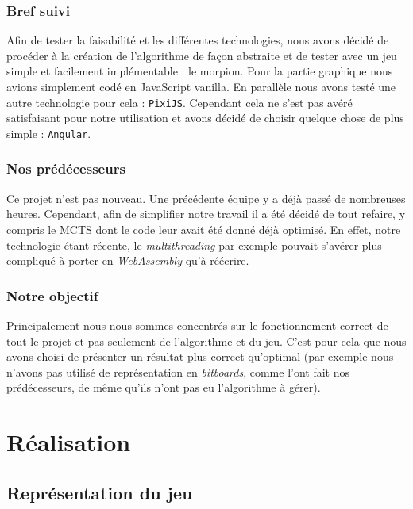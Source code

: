 \documentclass[a4paper,11pt]{article}
\begin{document}
\hypertarget{bref-suivi}{%
\subsubsection{Bref suivi}\label{bref-suivi}}

Afin de tester la faisabilité et les différentes technologies, nous
avons décidé de procéder à la création de l'algorithme de façon
abstraite et de tester avec un jeu simple et facilement implémentable :
le morpion. Pour la partie graphique nous avions simplement codé en
JavaScript vanilla. En parallèle nous avons testé une autre technologie
pour cela : \texttt{PixiJS}. Cependant cela ne s'est pas avéré
satisfaisant pour notre utilisation et avons décidé de choisir quelque
chose de plus simple : \texttt{Angular}.

\hypertarget{nos-pruxe9duxe9cesseurs}{%
\subsubsection{Nos prédécesseurs}\label{nos-pruxe9duxe9cesseurs}}

Ce projet n'est pas nouveau. Une précédente équipe y a déjà passé de
nombreuses heures. Cependant, afin de simplifier notre travail il a été
décidé de tout refaire, y compris le MCTS dont le code leur avait été
donné déjà optimisé. En effet, notre technologie étant récente, le
\emph{multithreading} par exemple pouvait s'avérer plus compliqué à
porter en \emph{WebAssembly} qu'à réécrire.

\hypertarget{notre-objectif}{%
\subsubsection{Notre objectif}\label{notre-objectif}}

Principalement nous nous sommes concentrés sur le fonctionnement correct
de tout le projet et pas seulement de l'algorithme et du jeu. C'est pour
cela que nous avons choisi de présenter un résultat plus correct
qu'optimal (par exemple nous n'avons pas utilisé de représentation en
\emph{bitboards}, comme l'ont fait nos prédécesseurs, de même qu'ils
n'ont pas eu l'algorithme à gérer).

\hypertarget{ruxe9alisation}{%
\section{Réalisation}\label{ruxe9alisation}}

\hypertarget{repruxe9sentation-du-jeu}{%
\subsection{Représentation du jeu}\label{repruxe9sentation-du-jeu}}
\end{document}

